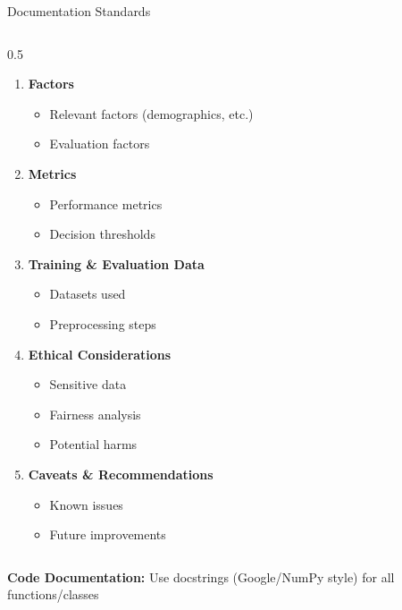 \begin{frame}[fragile]{Documentation Standards}
\begin{columns}
\begin{column}{0.5\textwidth}
\begin{enumerate}
\item \textbf{Factors}
   \begin{itemize}
   \item Relevant factors (demographics, etc.)
   \item Evaluation factors
   \end{itemize}

\item \textbf{Metrics}
   \begin{itemize}
   \item Performance metrics
   \item Decision thresholds
   \end{itemize}

\item \textbf{Training \& Evaluation Data}
   \begin{itemize}
   \item Datasets used
   \item Preprocessing steps
   \end{itemize}

\item \textbf{Ethical Considerations}
   \begin{itemize}
   \item Sensitive data
   \item Fairness analysis
   \item Potential harms
   \end{itemize}

\item \textbf{Caveats \& Recommendations}
   \begin{itemize}
   \item Known issues
   \item Future improvements
   \end{itemize}
\end{enumerate}
\end{column}
\end{columns}

\vspace{0.2cm}
\textbf{Code Documentation:} Use docstrings (Google/NumPy style) for all functions/classes
\end{frame}


